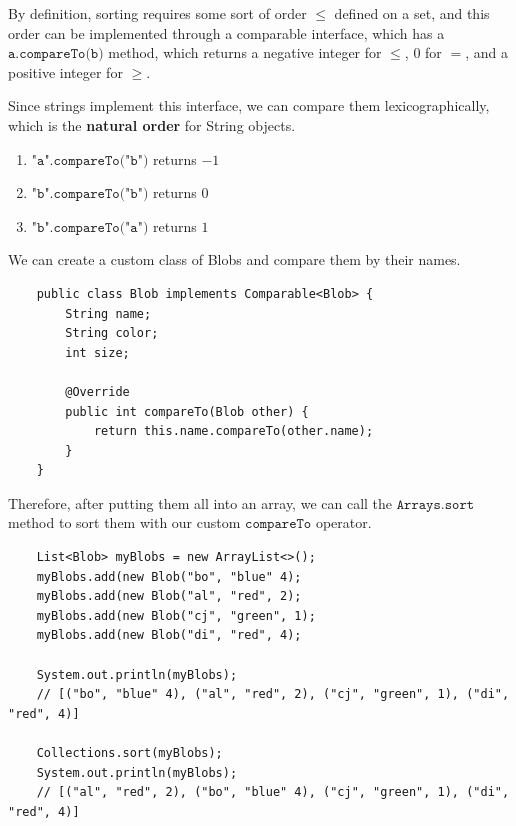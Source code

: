 \documentclass{article}
\begin{document}
    By definition, sorting requires some sort of order $\leq$ defined on a set, and this order can be implemented through a comparable interface, which has a $\texttt{a.compareTo(b)}$ method, which returns a negative integer for $\leq$, $0$ for $=$, and a positive integer for $\geq$. 

    \begin{example}
    Since strings implement this interface, we can compare them lexicographically, which is the \textbf{natural order} for String objects. 
    \begin{enumerate}
        \item $\texttt{"a".compareTo("b")}$ returns $-1$ 
        \item $\texttt{"b".compareTo("b")}$ returns $0$ 
        \item $\texttt{"b".compareTo("a")}$ returns $1$
    \end{enumerate}
    \end{example}

    \begin{example}
    We can create a custom class of Blobs and compare them by their names. 
    \begin{lstlisting}
    public class Blob implements Comparable<Blob> {
        String name; 
        String color; 
        int size; 
        
        @Override 
        public int compareTo(Blob other) {
            return this.name.compareTo(other.name); 
        }
    }
    \end{lstlisting}
    Therefore, after putting them all into an array, we can call the $\texttt{Arrays.sort}$ method to sort them with our custom $\texttt{compareTo}$ operator. 
    \begin{lstlisting}
    List<Blob> myBlobs = new ArrayList<>(); 
    myBlobs.add(new Blob("bo", "blue" 4); 
    myBlobs.add(new Blob("al", "red", 2); 
    myBlobs.add(new Blob("cj", "green", 1); 
    myBlobs.add(new Blob("di", "red", 4); 

    System.out.println(myBlobs); 
    // [("bo", "blue" 4), ("al", "red", 2), ("cj", "green", 1), ("di", "red", 4)]

    Collections.sort(myBlobs); 
    System.out.println(myBlobs); 
    // [("al", "red", 2), ("bo", "blue" 4), ("cj", "green", 1), ("di", "red", 4)]
    \end{lstlisting}
    \end{example}
\end{document}
